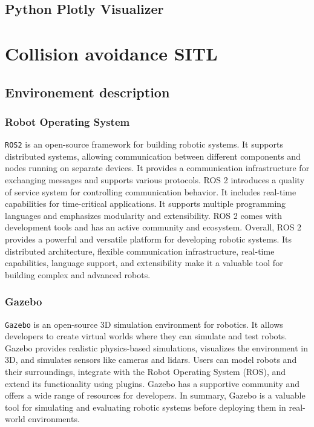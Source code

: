 \subsection{Python Plotly Visualizer}

\section{Collision avoidance SITL}
\subsection{Environement description}
\subsubsection{Robot Operating System}
\texttt{ROS2} is an open-source framework for building robotic systems. It supports distributed systems, allowing communication between different components and nodes running on separate devices.
It provides a communication infrastructure for exchanging messages and supports various protocols. ROS 2 introduces a quality of service system for controlling communication behavior.
It includes real-time capabilities for time-critical applications. It supports multiple programming languages and emphasizes modularity and extensibility. ROS 2 comes with development tools and has an active community and ecosystem.
Overall, ROS 2 provides a powerful and versatile platform for developing robotic systems. Its distributed architecture, flexible communication infrastructure, real-time capabilities, language support, and extensibility make it a valuable tool for building complex and advanced robots.
\subsubsection{Gazebo}
\texttt{Gazebo} is an open-source 3D simulation environment for robotics. It allows developers to create virtual worlds where they can simulate and test robots. Gazebo provides realistic physics-based simulations, visualizes the environment in 3D, and simulates sensors like cameras and lidars.
Users can model robots and their surroundings, integrate with the Robot Operating System (ROS), and extend its functionality using plugins. Gazebo has a supportive community and offers a wide range of resources for developers.
In summary, Gazebo is a valuable tool for simulating and evaluating robotic systems before deploying them in real-world environments.
